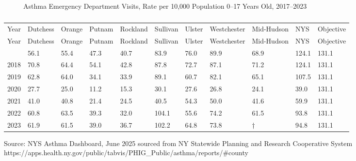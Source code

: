 \documentclass[
  english,
  letterpaper,
]{report}
\begin{document}
\begin{figure}


\caption{\label{fig-0to17-asthma-ed-rate}Asthma Emergency Department
Visits, Rate per 10,000 Population 0--17 Years Old, 2017--2023}

\end{figure}%

\begin{longtable}[]{@{}lllllllllll@{}}

\caption{\label{tbl-0to17-asthma-ed-rate}Asthma Emergency Department
Visits, Rate per 10,000 Population 0--17 Years Old, 2017--2023}

\tabularnewline

\caption{}\label{T_becd5}\tabularnewline
\toprule\noalign{}
Year & Dutchess & Orange & Putnam & Rockland & Sullivan & Ulster &
Westchester & Mid-Hudson & NYS & Objective \\
\midrule\noalign{}
\endfirsthead
\toprule\noalign{}
Year & Dutchess & Orange & Putnam & Rockland & Sullivan & Ulster &
Westchester & Mid-Hudson & NYS & Objective \\
\midrule\noalign{}
\endhead
\bottomrule\noalign{}
\endlastfoot
2017 & 56.1 & 55.4 & 47.3 & 40.7 & 83.9 & 76.0 & 89.9 & 68.9 & 124.1 &
131.1 \\
2018 & 70.8 & 64.4 & 54.1 & 42.8 & 87.8 & 72.7 & 87.1 & 71.2 & 124.1 &
131.1 \\
2019 & 62.8 & 64.0 & 34.1 & 33.9 & 89.1 & 60.7 & 82.1 & 65.1 & 107.5 &
131.1 \\
2020 & 27.7 & 25.0 & 11.2 & 15.3 & 30.1 & 27.6 & 26.8 & 24.1 & 39.0 &
131.1 \\
2021 & 41.0 & 40.8 & 21.4 & 24.5 & 40.5 & 54.3 & 50.0 & 41.6 & 59.9 &
131.1 \\
2022 & 60.8 & 63.5 & 39.3 & 32.0 & 104.1 & 55.6 & 74.2 & 61.5 & 93.8 &
131.1 \\
2023 & 61.9 & 61.5 & 39.0 & 36.7 & 102.2 & 64.8 & 73.8 & † & 94.8 &
131.1 \\

\end{longtable}

\begin{tcolorbox}[enhanced jigsaw, breakable, leftrule=.75mm, title=\textcolor{quarto-callout-note-color}{\faInfo}\hspace{0.5em}{Source}, bottomrule=.15mm, opacityback=0, left=2mm, colback=white, bottomtitle=1mm, coltitle=black, colbacktitle=quarto-callout-note-color!10!white, colframe=quarto-callout-note-color-frame, opacitybacktitle=0.6, toptitle=1mm, titlerule=0mm, arc=.35mm, rightrule=.15mm, toprule=.15mm]

Source: NYS Asthma Dashboard, June 2025 sourced from NY Statewide
Planning and Research Cooperative System
https://apps.health.ny.gov/public/tabvis/PHIG\_Public/asthma/reports/\#county

\end{tcolorbox}
\end{document}

